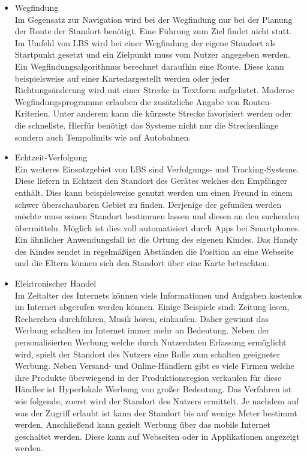 \begin{itemize}
	\item Wegfindung\\
Im Gegensatz zur Navigation wird bei der Wegfindung nur bei der Planung der Route der Standort benötigt. Eine Führung zum Ziel findet nicht statt. Im Umfeld von LBS wird bei einer Wegfindung der eigene Standort als Startpunkt gesetzt und ein Zielpunkt muss vom Nutzer angegeben werden. Ein Wegfindungsalgorithmus berechnet daraufhin eine Route. Diese kann beispielsweise auf einer Kartedargestellt werden oder jeder Richtungsänderung wird mit einer Strecke in Textform aufgelistet. Moderne Wegfindungsprogramme erlauben die zusätzliche Angabe von Routen- Kriterien. Unter anderem kann die kürzeste Strecke favorisiert werden oder die schnellste.  Hierfür benötigt das Systeme nicht nur die Streckenlänge sondern auch Tempolimits wie auf Autobahnen. 
	\item Echtzeit-Verfolgung\\
Ein weiteres Einsatzgebiet von LBS sind Verfolgungs- und Tracking-Systeme. Diese liefern in Echtzeit den Standort des Gerätes welches den Empfänger enthält. Dies kann beispielsweise genutzt werden um einen Freund in einem schwer überschaubaren Gebiet zu finden. Derjenige der gefunden werden möchte muss seinen Standort bestimmen lassen und diesen an den suchenden übermitteln. Möglich ist dies voll automatisiert durch Apps bei Smartphones. Ein ähnlicher Anwendungsfall ist die Ortung des eigenen Kindes. Das Handy des Kindes sendet in regelmäßigen Abständen die Position an eine Webseite und die Eltern können sich den Standort über eine Karte betrachten.  
	\item Elektronischer Handel\\
Im Zeitalter des Internets können viele Informationen und Aufgaben kostenlos im Internet abgerufen werden können. Einige Beispiele sind: Zeitung lesen, Recherchen durchführen, Musik hören, einkaufen. Daher gewinnt das Werbung schalten im Internet immer mehr an Bedeutung. Neben der personalisierten Werbung welche durch Nutzerdaten Erfassung ermöglicht wird, spielt der Standort des Nutzers eine Rolle zum schalten geeigneter Werbung. Neben Versand- und Online-Händlern gibt es viele Firmen welche ihre Produkte überwiegend in der Produktionsregion verkaufen für diese Händler ist Hyperlokale Werbung von großer Bedeutung. Das Verfahren ist wie folgende, zuerst wird der Standort des Nutzers ermittelt. Je nachdem auf was der Zugriff erlaubt ist kann der Standort bis auf wenige Meter bestimmt werden. Anschließend kann gezielt Werbung über das mobile Internet geschaltet werden. Diese kann auf Webseiten oder in Applikationen angezeigt werden. 

\end{itemize}
